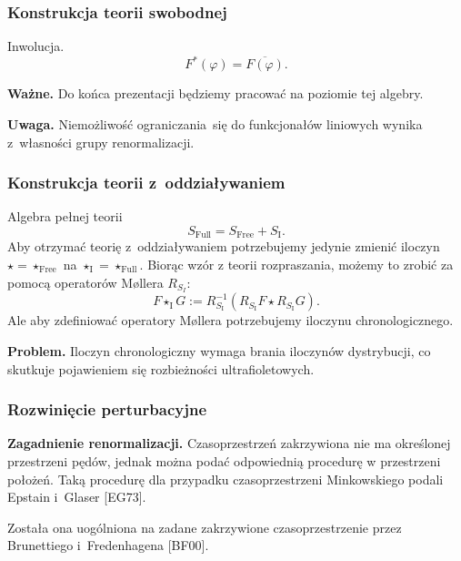 \documentclass[10pt,t]{beamer}
\begin{document}
\begin{frame}
  \frametitle{Konstrukcja teorii swobodnej}

  Inwolucja.
  \begin{equation}
    \label{eq:Niespodziewane-teoretyczne-22}
    F^{ * }( \varphi ) = \overline{ F( \varphi ) }.
  \end{equation}

  \textbf{Ważne.}
  Do końca prezentacji będziemy pracować na poziomie tej algebry.

  \textbf{Uwaga.}
  Niemożliwość ograniczania~się do funkcjonałów liniowych wynika
  z~własności grupy renormalizacji.

\end{frame}





\begin{frame}
  \frametitle{Konstrukcja teorii z~oddziaływaniem}


  Algebra pełnej teorii
  \begin{equation}
    \label{eq:Niespodziewane-teoretyczne-23}
    S_{ \mathrm{Full} } = S_{ \mathrm{Free} } + S_{ \mathrm{I} }.
  \end{equation}
  Aby otrzymać teorię z~oddziaływaniem potrzebujemy jedynie
  zmienić iloczyn $\star = \star_{ \mathrm{Free} }$ na
  $\star_{ \mathrm{I} } = \star_{ \mathrm{Full} }$. Biorąc wzór z teorii
  rozpraszania, możemy to zrobić za pomocą operatorów M\o llera
  $R_{ S_{ I } }$:
  \begin{equation}
    \label{eq:Niespodziewane-teoretyczne-24}
    F \star_{ \mathrm{I} } G :=
    R_{ S_{ \mathrm{I} } }^{ -1 }( R_{ S_{ \mathrm{I} } } F
    \star R_{ S_{ \mathrm{I} } } G ).
  \end{equation}
  Ale aby zdefiniować operatory M\o llera potrzebujemy iloczynu
  chronologicznego.

  \textbf{Problem.}
  Iloczyn chronologiczny wymaga brania iloczynów dystrybucji, co skutkuje
  pojawieniem się rozbieżności ultrafioletowych.

\end{frame}





\begin{frame}
  \frametitle{Rozwinięcie perturbacyjne}

  \textbf{Zagadnienie renormalizacji.}
  Czasoprzestrzeń zakrzywiona nie ma określonej przestrzeni pędów,
  jednak można podać odpowiednią procedurę w przestrzeni położeń.
  Taką procedurę dla przypadku czasoprzestrzeni Minkowskiego
  podali Epstain i~Glaser [EG73].

  Została ona uogólniona na zadane zakrzywione czasoprzestrzenie
  przez Brunettiego i~Fredenhagena [BF00].

\end{frame}
\end{document}

